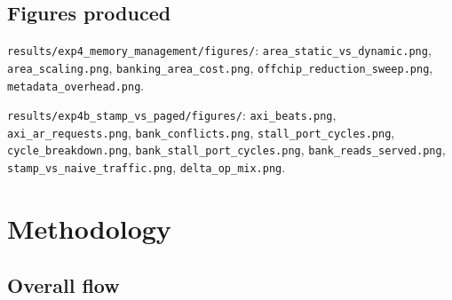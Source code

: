 \documentclass[11pt,a4paper]{article}
\newcommand{\file}[1]{\texttt{\small #1}}
\begin{document}
\subsection{Figures produced}

\file{results/exp4\_memory\_management/figures/}: \file{area\_static\_vs\_dynamic.png},
\file{area\_scaling.png}, \file{banking\_area\_cost.png},
\file{offchip\_reduction\_sweep.png}, \file{metadata\_overhead.png}.

\file{results/exp4b\_stamp\_vs\_paged/figures/}: \file{axi\_beats.png},
\file{axi\_ar\_requests.png}, \file{bank\_conflicts.png},
\file{stall\_port\_cycles.png}, \file{cycle\_breakdown.png},
\file{bank\_stall\_port\_cycles.png}, \file{bank\_reads\_served.png},
\file{stamp\_vs\_naive\_traffic.png}, \file{delta\_op\_mix.png}.

\section{Methodology}

\subsection{Overall flow}
\end{document}
